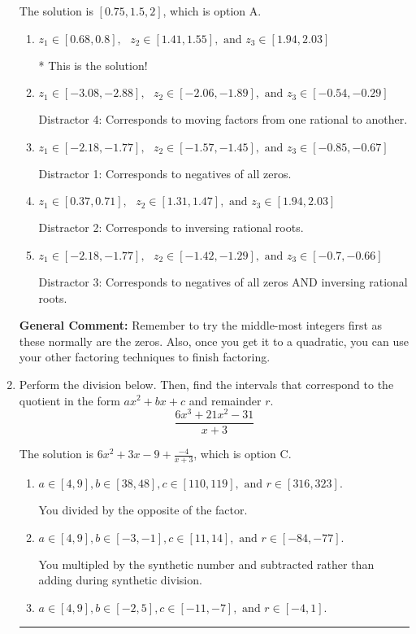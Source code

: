 \documentclass{extbook}[14pt]
\newcommand{\litem}[1]{\item #1

\rule{\textwidth}{0.4pt}}
\begin{document}
\begin{enumerate}
{The solution is \( [0.75, 1.5, 2] \), which is option A.\begin{enumerate}[label=\Alph*.]
\item \( z_1 \in [0.68, 0.8], \text{   }  z_2 \in [1.41, 1.55], \text{   and   } z_3 \in [1.94, 2.03] \)

* This is the solution!
\item \( z_1 \in [-3.08, -2.88], \text{   }  z_2 \in [-2.06, -1.89], \text{   and   } z_3 \in [-0.54, -0.29] \)

 Distractor 4: Corresponds to moving factors from one rational to another.
\item \( z_1 \in [-2.18, -1.77], \text{   }  z_2 \in [-1.57, -1.45], \text{   and   } z_3 \in [-0.85, -0.67] \)

 Distractor 1: Corresponds to negatives of all zeros.
\item \( z_1 \in [0.37, 0.71], \text{   }  z_2 \in [1.31, 1.47], \text{   and   } z_3 \in [1.94, 2.03] \)

 Distractor 2: Corresponds to inversing rational roots.
\item \( z_1 \in [-2.18, -1.77], \text{   }  z_2 \in [-1.42, -1.29], \text{   and   } z_3 \in [-0.7, -0.66] \)

 Distractor 3: Corresponds to negatives of all zeros AND inversing rational roots.
\end{enumerate}

\textbf{General Comment:} Remember to try the middle-most integers first as these normally are the zeros. Also, once you get it to a quadratic, you can use your other factoring techniques to finish factoring.
}
\litem{
Perform the division below. Then, find the intervals that correspond to the quotient in the form $ax^2+bx+c$ and remainder $r$.
\[ \frac{6x^{3} +21 x^{2} -31}{x + 3} \]

The solution is \( 6x^{2} +3 x -9 + \frac{-4}{x + 3} \), which is option C.\begin{enumerate}[label=\Alph*.]
\item \( a \in [4, 9], b \in [38, 48], c \in [110, 119], \text{ and } r \in [316, 323]. \)

 You divided by the opposite of the factor.
\item \( a \in [4, 9], b \in [-3, -1], c \in [11, 14], \text{ and } r \in [-84, -77]. \)

 You multipled by the synthetic number and subtracted rather than adding during synthetic division.
\item \( a \in [4, 9], b \in [-2, 5], c \in [-11, -7], \text{ and } r \in [-4, 1]. \)


\end{enumerate}}
\end{enumerate}
\end{document}
